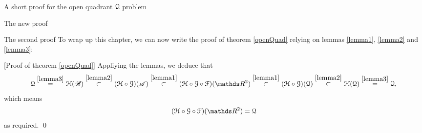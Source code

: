 \documentclass[11pt, a4paper, english, twoside, notitlepage, openright]{report}
\begin{document}
\begin{chapter}{A short proof for the open quadrant $\mathcal{Q}$ problem}
\begin{section}{The new proof}
\begin{subsection}{The second proof}
To wrap up this chapter, we can now write the proof of theorem \ref{openQuad} relying on lemmas \ref{lemma1}, \ref{lemma2} and \ref{lemma3}:

\vspace{1mm}

[Proof of theorem \ref{openQuad}] Appliying the lemmas, we deduce that
$$
\Qu \overset{\ref{lemma3}}{=} \HH(\mathscr{B}) \overset{\ref{lemma2}}{\subset} (\HH \circ \GG)(\mathscr{A}) \overset{\ref{lemma1}}{\subset} (\HH \circ \GG \circ \FF)(\R^2) \overset{\ref{lemma1}}{\subset} (\HH \circ \GG)(\Qu) \overset{\ref{lemma2}}{\subset} \HH(\Qu) \overset{\ref{lemma3}}{=} \Qu,
$$
which means 
$$
(\HH \circ \GG \circ \FF)(\R^2) = \Qu
$$
as required.
\qed
\end{subsection}



\end{section}
\end{chapter}
\end{document}
